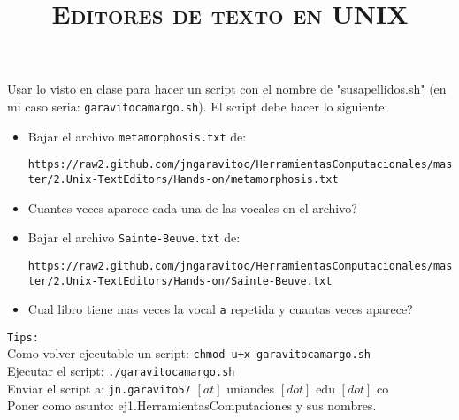 \documentclass[12pt]{article}
\title{\textsc{Editores de texto en UNIX}}
\begin{document}
\date{}
\maketitle


Usar lo visto en clase para hacer un script con el nombre de "susapellidos.sh" (en mi caso seria: \texttt{garavitocamargo.sh}).
El script debe hacer lo siguiente:\\

\begin{itemize}

\item Bajar el archivo \texttt{metamorphosis.txt} de:\\
\begin{scriptsize}
\verb"https://raw2.github.com/jngaravitoc/HerramientasComputacionales/master/2.Unix-TextEditors/Hands-on/metamorphosis.txt"
\end{scriptsize}  

\item Cuantes veces aparece cada una de las vocales en el archivo?

\item Bajar el archivo \texttt{Sainte-Beuve.txt} de: 

\begin{scriptsize}
\verb"https://raw2.github.com/jngaravitoc/HerramientasComputacionales/master/2.Unix-TextEditors/Hands-on/Sainte-Beuve.txt"
\end{scriptsize} 

\item Cual libro tiene mas veces la vocal \texttt{a} repetida y cuantas veces aparece?


\end{itemize}

\texttt{Tips:}\\

Como volver ejecutable un script: \texttt{chmod u+x garavitocamargo.sh}\\

Ejecutar el script: \texttt{./garavitocamargo.sh}\\

Enviar el script a: \texttt{jn.garavito57} $[at]$ uniandes $[dot]$ edu $[dot]$ co  \\

Poner como asunto: ej1.HerramientasComputaciones y sus nombres.
\end{document}
